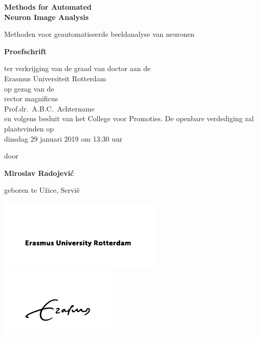 %
%

\setlength{\parindent}{0pt}
\thispagestyle{empty}

\begin{center}
  
  \vspace*{5mm}
  {\huge\bf Methods for Automated\\[0.3ex] Neuron Image Analysis\\}

  \vfill
  \vfill
  \vfill

  {\large Methoden voor geautomatiseerde beeldanalyse van neuronen\\[1ex]}


  \vfill
  \vfill
  \vfill
  \vfill

  {\large\bf Proefschrift}
  {\large 
  \vfill
  \vfill
  
  \normalsize
  
  ter verkrijging van de graad van doctor aan de \\Erasmus Universiteit Rotterdam\\
op gezag van de \\rector magnificus\\
  \vfill
Prof.dr.~A.B.C.~Achtername\\
  \vfill
en volgens besluit van het College voor Promoties. 
  \vfill
De openbare verdediging zal plaatsvinden op \\dinsdag 29 januari 2019 om 13:30 uur
  
  
  \vfill
  \vfill
  
  \large
  door}

  \vfill
  \vfill
  \vfill

  {\large\bf Miroslav Radojevi\'{c}}

  \vfill

  {\large geboren te U\v{z}ice, Servi{\"e}}

  \vfill
\includegraphics[height=9em]{./logos/EUR_line_02_RGB_black}
\includegraphics[height=9em]{./logos/EUR_signature_02_RGB_black}
\end{center}

